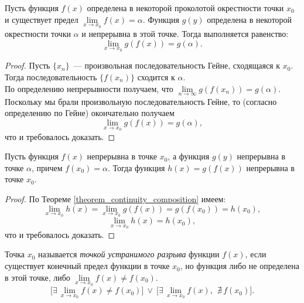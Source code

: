 
\begin{theorem}
\label{theorem_continuity_composition}
Пусть функция \(f(x)\) определена в некоторой проколотой окрестности точки \(x_{0}\)
и существует предел \(\lim\limits_{x \to x_{0}} f(x) = \alpha\).
Функция \(g(y)\) определена в некоторой окрестности точки \(\alpha\)
и непрерывна в этой точке. Тогда выполняется равенство:
\[
\lim_{ x \to x_{0} } g(f(x)) = g(\alpha).
\]

\begin{proof}
Пусть \(\{x_{n}\}\)~--- произвольная последовательность Гейне, сходящаяся к \(x_{0}\).
Тогда последовательность \(\{f(x_{n})\}\) сходится к \(\alpha\). \\
По определению непрерывности получаем, что \(\lim\limits_{n \to \infty} g(f(x_{n})) = g(\alpha)\).
Поскольку мы брали произвольную последовательность Гейне,
то (согласно определению по Гейне) окончательно получаем
\[
\lim_{ x \to x_{0} } g(f(x)) = g(\alpha),
\]
что и требовалось доказать.
\end{proof}
\end{theorem}

\begin{theorem}
Пусть функция \(f(x)\) непрерывна в точке \(x_{0}\), а функция \(g(y)\)
непрерывна в точке \(\alpha\), причем \(f(x_{0}) = \alpha\).
Тогда функция \(h(x) = g(f(x))\) непрерывна в точке \(x_{0}\).

\begin{proof}
По Теореме \ref{theorem_continuity_composition} имеем:
\[
\lim_{ x \to x_{0} } h(x) = \lim_{ x \to x_{0} } g(f(x)) = g(f(x_{0})) = h(x_{0}),
\]
\[
\lim_{ x \to x_{0} } h(x) = h(x_{0}),
\]
что и требовалось доказать.
\end{proof}
\end{theorem}


\begin{definition}
Точка \(x_{0}\) называется \textit{точкой устранимого разрыва} функции \(f(x)\),
если существует конечный предел функции в точке \(x_{0}\), но функция либо не определена
в этой точке, либо \(\lim\limits_{x \to x_{0}} f(x) \neq f(x_{0})\).
\[
\Big[ \exists \, \lim_{ x \to x_{0} } f(x) \neq f(x_{0}) \Big] ~ \vee ~
\Big[ \exists \, \lim_{ x \to x_{0} } f(x), ~~ \nexists \, f(x_{0}) \Big].
\]
\end{definition}

